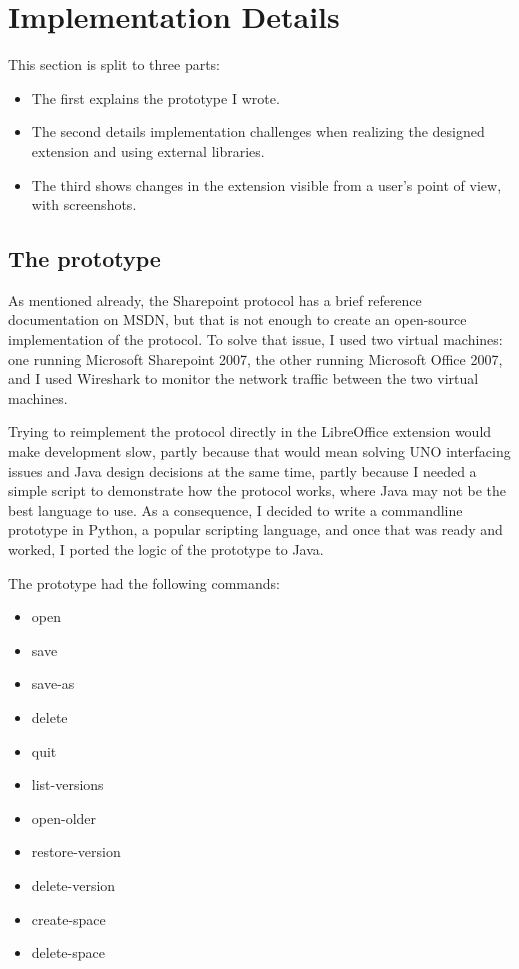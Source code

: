 \section{Implementation Details}

This section is split to three parts:

\begin{itemize}
\item The first explains the prototype I wrote.
\item The second details implementation challenges when realizing the designed extension and using external libraries.
\item The third shows changes in the extension visible from a user's point of view, with screenshots.
\end{itemize}

\subsection{The prototype}

As mentioned already, the Sharepoint protocol has a brief reference
documentation on MSDN, but that is not enough to create an open-source
implementation of the protocol. To solve that issue, I used two virtual
machines: one running Microsoft Sharepoint 2007, the other running Microsoft
Office 2007, and I used Wireshark\cite{wireshark} to monitor the network
traffic between the two virtual machines.

Trying to reimplement the protocol directly in the LibreOffice extension would
make development slow, partly because that would mean solving UNO interfacing
issues and Java design decisions at the same time, partly because I needed a
simple script to demonstrate how the protocol works, where Java may not be the
best language to use. As a consequence, I decided to write a commandline
prototype in Python, a popular scripting language, and once that was ready and
worked, I ported the logic of the prototype to Java.

The prototype had the following commands:

\begin{itemize}
\item open
\item save
\item save-as
\item delete
\item quit
\item list-versions
\item open-older
\item restore-version
\item delete-version
\item create-space
\item delete-space
\end{itemize}

